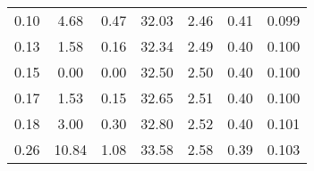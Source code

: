 \begin{tabular}{@{}ccccccc@{}}
0.10 & 4.68                                                                           & 0.47                                                          & 32.03                                                                     & 2.46                                                                        & 0.41                                                                       & 0.099                                                                   \\
0.13 & 1.58                                                                           & 0.16                                                          & 32.34                                                                     & 2.49                                                                        & 0.40                                                                       & 0.100                                                                   \\
0.15 & 0.00                                                                           & 0.00                                                          & 32.50                                                                     & 2.50                                                                        & 0.40                                                                       & 0.100                                                                   \\
0.17 & 1.53                                                                           & 0.15                                                          & 32.65                                                                     & 2.51                                                                        & 0.40                                                                       & 0.100                                                                   \\
0.18 & 3.00                                                                           & 0.30                                                          & 32.80                                                                     & 2.52                                                                        & 0.40                                                                       & 0.101                                                                   \\
0.26 & 10.84                                                                          & 1.08                                                          & 33.58                                                                     & 2.58                                                                        & 0.39                                                                       & 0.103                                                                   \\

\end{tabular}
